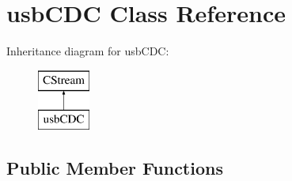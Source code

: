 \hypertarget{classusb_c_d_c}{\section{usb\-C\-D\-C Class Reference}
\label{classusb_c_d_c}
}
Inheritance diagram for usb\-C\-D\-C\-:\begin{figure}[H]
\begin{center}
\leavevmode
\includegraphics[height=2.000000cm]{classusb_c_d_c}
\end{center}
\end{figure}
\subsection*{Public Member Functions}
